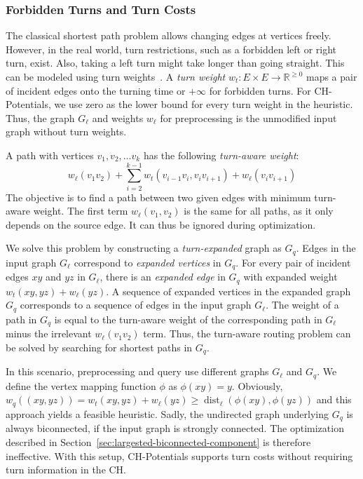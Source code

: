 \documentclass[manuscript]{acmart}
\newcommand*{\dist}{\operatorname{dist}}
\begin{document}
\subsubsection{Forbidden Turns and Turn Costs}
\label{sec:no-turns}

The classical shortest path problem allows changing edges at vertices freely.
However, in the real world, turn restrictions, such as a forbidden left or right turn, exist.
Also, taking a left turn might take longer than going straight.
This can be modeled using turn weights~\cite{gv-errnt-11,dgpw-crprn-13,bwzz-cchtc-20}.
A \emph{turn weight} $w_t : E \times E \to \mathbb{R}^{\geq 0}$ maps a pair of incident edges onto the turning time or $+\infty$ for forbidden turns.
For CH-Potentials, we use zero as the lower bound for every turn weight in the heuristic.
Thus, the graph $G_\ell$ and weights $w_\ell$ for preprocessing is the unmodified input graph without turn weights.

A path with vertices $v_1, v_2,\ldots v_k$ has the following \emph{turn-aware weight}: \[
w_\ell(v_1 v_2) + \sum_{i=2}^{k-1}  w_t(v_{i-1} v_i, v_i v_{i+1}) + w_\ell(v_i v_{i+1})
\]
The objective is to find a path between two given edges with minimum turn-aware weight.
The first term $w_\ell(v_1, v_2)$ is the same for all paths, as it only depends on the source edge.
It can thus be ignored during optimization.

We solve this problem by constructing a \emph{turn-expanded} graph as $G_q$.
Edges in the input graph $G_\ell$ correspond to \emph{expanded vertices} in $G_q$.
For every pair of incident edges $x y$ and $y z$ in $G_\ell$, there is an \emph{expanded edge} in $G_q$ with expanded weight $w_t(xy,yz) + w_\ell(y z)$.
A sequence of expanded vertices in the expanded graph $G_q$ corresponds to a sequence of edges in the input graph $G_\ell$.
The weight of a path in $G_q$ is equal to the turn-aware weight of the corresponding path in $G_\ell$ minus the irrelevant $w_\ell(v_1 v_2)$ term.
Thus, the turn-aware routing problem can be solved by searching for shortest paths in $G_q$.

In this scenario, preprocessing and query use different graphs $G_\ell$ and $G_q$.
We define the vertex mapping function $\phi$ as $\phi(x y) = y$.
Obviously, $w_q((xy, yz)) = w_t(xy,yz) + w_\ell(y z) \geq \dist_\ell(\phi(x y), \phi(y z))$ and this approach yields a feasible heuristic.
Sadly, the undirected graph underlying $G_q$ is always biconnected, if the input graph is strongly connected.
The optimization described in Section~\ref{sec:largested-biconnected-component} is therefore ineffective.
With this setup, CH-Potentials supports turn costs without requiring turn information in the CH.
\end{document}
